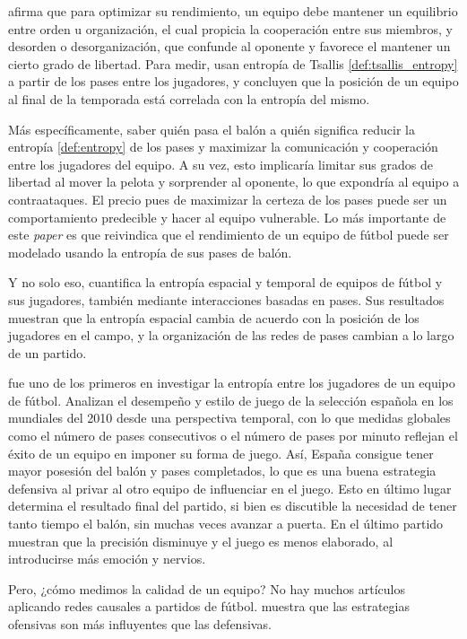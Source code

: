 \cite{entropy-analysis} afirma que para optimizar su rendimiento, un 
equipo debe mantener un equilibrio entre orden u organización, el cual 
propicia la cooperación entre sus miembros, y desorden o desorganización, que confunde 
al oponente y favorece el mantener un cierto grado de libertad. Para medir, usan entropía de 
Tsallis \ref{def:tsallis_entropy} a partir de los pases entre los jugadores, y concluyen que la posición de un equipo 
al final de la temporada está correlada con la entropía del mismo. 

Más específicamente, saber quién pasa el balón a quién significa reducir la entropía \ref{def:entropy} de los pases y maximizar 
la comunicación y cooperación entre los jugadores del equipo. A su vez, esto implicaría limitar sus 
grados de libertad al mover la pelota y sorprender al oponente, lo que expondría al equipo a contraataques. El precio 
pues de maximizar la certeza de los pases puede ser un comportamiento predecible y hacer al equipo vulnerable. Lo más importante 
de este \textit{paper} es que reivindica que el rendimiento de un equipo de fútbol puede 
ser modelado usando la entropía de sus pases de balón.

Y no solo eso, \cite{spatial-and-temporal-entropies} cuantifica la entropía espacial y temporal de 
equipos de fútbol y sus jugadores, también mediante interacciones basadas en pases. Sus resultados 
muestran que la entropía espacial cambia de acuerdo con la posición de los jugadores en el campo, y la 
organización de las redes de pases cambian a lo largo de un partido. 

\cite{network-analysis} fue uno de los primeros en investigar la entropía entre los jugadores de un equipo de 
fútbol. Analizan el desempeño y estilo de juego de la selección española en los mundiales del 2010 desde una 
perspectiva temporal, con lo que medidas globales como el número de pases consecutivos o el número de 
pases por minuto reflejan el éxito de un equipo en imponer su forma de juego.
Así, España consigue tener mayor posesión del balón y pases completados, lo que es una buena estrategia defensiva 
al privar al otro equipo de influenciar en el juego. Esto en último lugar determina el resultado final del partido, 
si bien es discutible la necesidad de tener tanto tiempo el balón, sin muchas veces avanzar a puerta. En el 
último partido muestran que la precisión disminuye y el juego es menos elaborado, al introducirse 
más emoción y nervios.

Pero, ¿cómo medimos la calidad de un equipo? No hay muchos artículos aplicando redes causales a partidos de 
fútbol. \cite{cerqueira} muestra que las estrategias ofensivas son más influyentes que las defensivas.




 